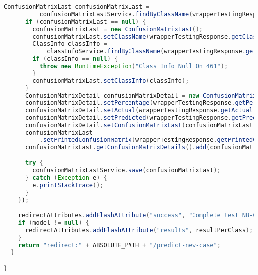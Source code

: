 \begin{lstlisting}[language=Java,basicstyle=\tiny,caption=TestingController.java]
      ConfusionMatrixLast confusionMatrixLast =
          confusionMatrixLastService.findByClassName(wrapperTestingResponse.getClassName());
      if (confusionMatrixLast == null) {
        confusionMatrixLast = new ConfusionMatrixLast();
        confusionMatrixLast.setClassName(wrapperTestingResponse.getClassName());
        ClassInfo classInfo =
            classInfoService.findByClassName(wrapperTestingResponse.getClassName());
        if (classInfo == null) {
          throw new RuntimeException("Class Info Null On 461");
        }
        confusionMatrixLast.setClassInfo(classInfo);
      }
      ConfusionMatrixDetail confusionMatrixDetail = new ConfusionMatrixDetail();
      confusionMatrixDetail.setPercentage(wrapperTestingResponse.getPercentage());
      confusionMatrixDetail.setActual(wrapperTestingResponse.getActual());
      confusionMatrixDetail.setPredicted(wrapperTestingResponse.getPredicted());
      confusionMatrixDetail.setConfusionMatrixLast(confusionMatrixLast);
      confusionMatrixLast
          .setPrintedConfusionMatrix(wrapperTestingResponse.getPrintedConfusionMatrix());
      confusionMatrixLast.getConfusionMatrixDetails().add(confusionMatrixDetail);

      try {
        confusionMatrixLastService.save(confusionMatrixLast);
      } catch (Exception e) {
        e.printStackTrace();
      }
    });

    redirectAttributes.addFlashAttribute("success", "Complete test NB-Classifier");
    if (model != null) {
      redirectAttributes.addFlashAttribute("results", resultPerClass);
    }
    return "redirect:" + ABSOLUTE_PATH + "/predict-new-case";
  }

}
\end{lstlisting}

